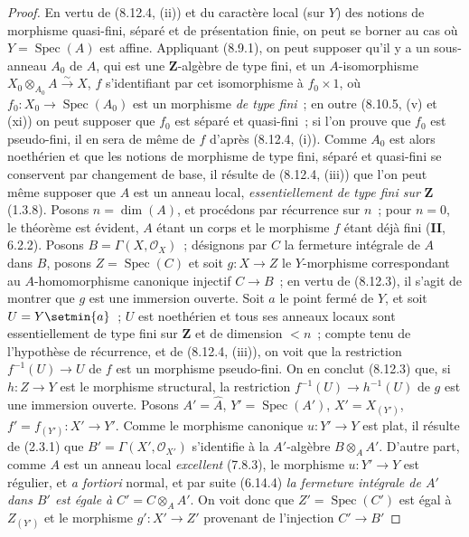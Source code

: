 \begin{proof}
En vertu de (8.12.4, (ii)) et du caractère local (sur $Y$) des notions de
morphisme quasi-fini, séparé et de présentation finie, on peut se borner au
cas où $Y=\operatorname{Spec}(A)$ est affine. Appliquant (8.9.1), on peut
supposer qu'il y a un sous-anneau $A_0$ de $A$, qui est une
$\mathbf Z$-algèbre de type fini, et un $A$-isomorphisme
$X_0\otimes_{A_0}A\xrightarrow{\sim}X$, $f$ s'identifiant par cet
isomorphisme à $f_0\times 1$, où
$f_0:X_0\to\operatorname{Spec}(A_0)$ est un morphisme \emph{de type fini}~;
en outre (8.10.5, (v) et (xi)) on peut supposer que $f_0$ est séparé et
quasi-fini~; si l'on prouve que $f_0$ est pseudo-fini, il en sera de même de
$f$ d'après (8.12.4, (i)). Comme $A_0$ est alors noethérien et que les
notions de morphisme de type fini, séparé et quasi-fini se conservent par
changement de base, il résulte de (8.12.4, (iii)) que l'on peut même supposer
que $A$ est un anneau local, \emph{essentiellement de type fini sur}
$\mathbf Z$ (1.3.8). Posons $n=\dim(A)$, et procédons par récurrence sur $n$~;
pour $n=0$, le théorème est évident, $A$ étant un corps et le morphisme $f$
étant déjà fini (\textbf{II}, 6.2.2). Posons $B=\Gamma(X,\mathcal O_X)$~; désignons
par $C$ la fermeture intégrale de $A$ dans $B$, posons
$Z=\operatorname{Spec}(C)$ et soit $g:X\to Z$ le $Y$-morphisme correspondant
au $A$-homomorphisme canonique injectif $C\to B$~; en vertu de (8.12.3), il
s'agit de montrer que $g$ est une immersion ouverte. Soit $a$ le point fermé
de $Y$, et soit $U=Y\setmin\{a\}$~; $U$ est noethérien et tous ses anneaux locaux
sont essentiellement de type fini sur $\mathbf Z$ et de dimension $<n$~;
compte tenu de l'hypothèse de récurrence, et de (8.12.4, (iii)), on voit que
la restriction $f^{-1}(U)\to U$ de $f$ est un morphisme pseudo-fini. On en
conclut (8.12.3) que, si $h:Z\to Y$ est le morphisme structural, la
restriction $f^{-1}(U)\to h^{-1}(U)$ de $g$ est une immersion ouverte.
Posons $A'=\widehat A$, $Y'=\operatorname{Spec}(A')$,
$X'=X_{(Y')}$, $f'=f_{(Y')}:X'\to Y'$. Comme le morphisme canonique
$u:Y'\to Y$ est plat, il résulte de (2.3.1) que
$B'=\Gamma(X',\mathcal O_{X'})$ s'identifie à la $A'$-algèbre
$B\otimes_A A'$.
D'autre part, comme $A$ est un anneau local \emph{excellent} (7.8.3), le
morphisme $u:Y'\to Y$ est régulier, et \emph{a fortiori} normal, et par suite
(6.14.4) \emph{la fermeture intégrale de $A'$ dans $B'$ est égale à}
$C'=C\otimes_A A'$. On voit donc que $Z'=\operatorname{Spec}(C')$ est égal à
$Z_{(Y')}$ et le morphisme $g':X'\to Z'$ provenant de l'injection $C'\to B'$

\end{proof}

